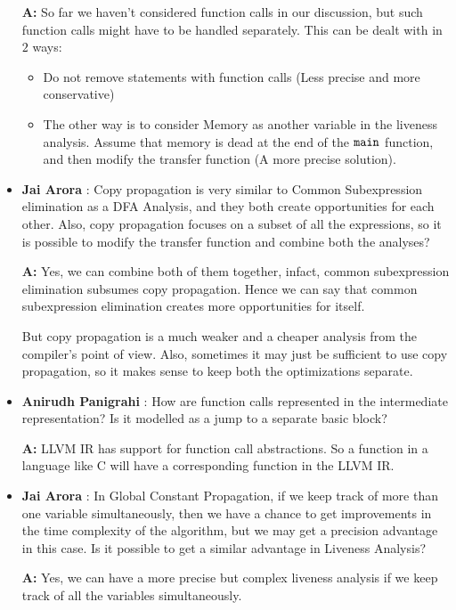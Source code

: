 \begin{itemize}
        \textbf{A:} So far we haven't considered function calls in our discussion, but such function calls might have to be handled separately. This can be dealt with in $2$ ways:
            \begin{itemize}
                \item Do not remove statements with function calls (Less precise and more conservative)
                \item The other way is to consider Memory as another variable in the liveness analysis. Assume that memory is dead at the end of the ${\tt main}$ function, and then modify the transfer function (A more precise solution).
            \end{itemize}
    
    \item \textbf{Jai Arora} : Copy propagation is very similar to Common Subexpression elimination as a DFA Analysis, and they both create opportunities for each other. Also, copy propagation focuses on a subset of all the expressions, so it is possible to modify the transfer function and combine both the analyses?
            
            \textbf{A:} Yes, we can combine both of them together, infact, common subexpression elimination subsumes copy propagation. Hence we can say that common subexpression elimination creates more opportunities for itself.

            But copy propagation is a much weaker and a cheaper analysis from the compiler's point of view. Also, sometimes it may just be sufficient to use copy propagation, so it makes sense to keep both the optimizations separate.

    \item \textbf{Anirudh Panigrahi} : How are function calls represented in the intermediate representation? Is it modelled as a jump to a separate basic block?
            
            \textbf{A:} LLVM IR has support for function call abstractions. So a function in a language like C will have a corresponding function in the LLVM IR.

    \item \textbf{Jai Arora} : In Global Constant Propagation, if we keep track of more than one variable simultaneously, then we have a chance to get improvements in the time complexity of the algorithm, but we may get a precision advantage in this case. Is it possible to get a similar advantage in Liveness Analysis?
    
            \textbf{A:} Yes, we can have a more precise but complex liveness analysis if we keep track of all the variables simultaneously.


\end{itemize}
